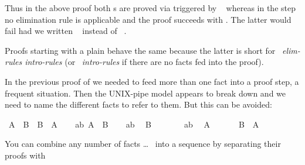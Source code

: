 \begin{isabellebody}
\begin{isamarkuptext}
Thus in the above proof both s are proved via
 triggered by ~ whereas
in the  step no elimination rule is applicable and
the proof succeeds with . The latter would fail had
we written ~ instead of
~.

Proofs starting with a plain  behave the same because the
latter is short for ~\textit{elim-rules
intro-rules}\isa{{\isacharparenright}} (or ~\textit{intro-rules}\isa{{\isacharparenright}} if there are no facts fed into
the proof).%
\end{isamarkuptext}%
\isamarkuptrue%
%
\isamarkuptrue%
%
\begin{isamarkuptext}%
In the previous proof of  we needed to feed
more than one fact into a proof step, a frequent situation. Then the
UNIX-pipe model appears to break down and we need to name the different
facts to refer to them. But this can be avoided:%
\end{isamarkuptext}%
\isamarkupfalse%
\ {\isachardoublequote}A\ {\isasymand}\ B\ {\isasymlongrightarrow}\ B\ {\isasymand}\ A{\isachardoublequote}\isanewline
%
\isadelimproof
%
\endisadelimproof
%
\isatagproof
\isamarkupfalse%
\isanewline
\ \ \isamarkupfalse%
\ ab{\isacharcolon}\ {\isachardoublequote}A\ {\isasymand}\ B{\isachardoublequote}\isanewline
\ \ \isamarkupfalse%
\ ab\ \isamarkupfalse%
\ {\isachardoublequote}B{\isachardoublequote}\ \isamarkupfalse%
\isacommand{{\isachardot}{\isachardot}}\isanewline
\ \ \isamarkupfalse%
\isanewline
\ \ \isamarkupfalse%
\ ab\ \isamarkupfalse%
\ {\isachardoublequote}A{\isachardoublequote}\ \isamarkupfalse%
\isacommand{{\isachardot}{\isachardot}}\isanewline
\ \ \isamarkupfalse%
\ \isamarkupfalse%
\ {\isachardoublequote}B\ {\isasymand}\ A{\isachardoublequote}\ \isamarkupfalse%
\isacommand{{\isachardot}{\isachardot}}\isanewline
\isamarkupfalse%
%
\endisatagproof
{\isafoldproof}%
%
\isadelimproof
%
\endisadelimproof
\isamarkuptrue%
%
\begin{isamarkuptext}%
\noindent You can combine any number of facts  \dots\  into a sequence by separating their proofs with

\end{isamarkuptext}
\end{isabellebody}
